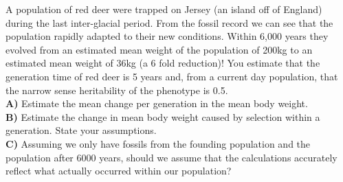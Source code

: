 \begin{question}
A population of red deer were trapped on Jersey (an island off of
England) during the last inter-glacial period. From the fossil record \cite{lister:89}
we can see that the population rapidly adapted to their new
conditions. Within 6,000 years they evolved from an estimated mean weight of
the population of 200kg to an estimated mean weight of 36kg (a 6 fold
reduction)! You estimate that the generation time
of red deer is 5 years and, from a current day population, that the narrow sense heritability of the
phenotype is 0.5.\\
{\bf A)}	Estimate the mean change per generation in the mean body weight. \\

{\bf B)}	Estimate the change in mean body weight caused by
selection within a generation. State your assumptions.\\

{\bf C)}	Assuming we only have fossils from the founding population and the population after 6000 years, should we assume that the calculations accurately reflect what actually occurred within our population?
\end{question}

